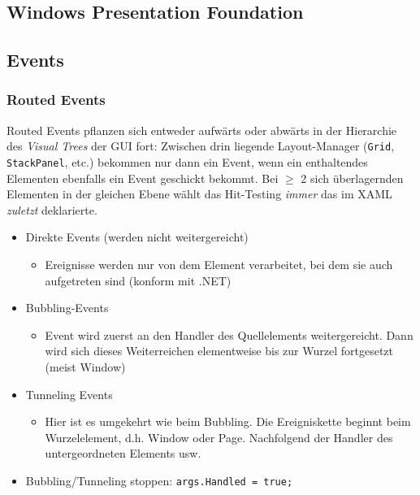 \documentclass
[
	8pt,		%
	ngerman,	%
	a4paper,	%
	landscape,	%
	final		%
]{extarticle}
\begin{document}
\begin{multicols*}{3}
	\section{Windows Presentation Foundation}
	
	
	\subsection{Events}
	
	
	\subsubsection{Routed Events}
	Routed Events pflanzen sich entweder aufwärts oder abwärts in der Hierarchie
	des \emph{Visual Trees} der GUI fort: Zwischen drin liegende Layout-Manager
	(\texttt{Grid}, \texttt{StackPanel}, etc.) bekommen nur dann ein Event, wenn
	ein enthaltendes Elementen ebenfalls ein Event geschickt bekommt. Bei \(\ge\)
	2 sich überlagernden Elementen in der gleichen Ebene wählt das Hit-Testing
	\emph{immer} das im XAML \emph{zuletzt} deklarierte.
	\begin{itemize}
		\item Direkte Events (werden nicht weitergereicht)
		      \begin{itemize}[nolistsep]
			      \item Ereignisse werden nur von dem Element verarbeitet, bei
			            dem sie auch aufgetreten sind (konform mit .NET)
		      \end{itemize}
		\item Bubbling-Events
		      \begin{itemize}[nolistsep]
			      \item Event wird zuerst an den Handler des Quellelements
			            weitergereicht. Dann wird sich dieses Weiterreichen
			            elementweise bis zur Wurzel fortgesetzt (meist Window)
		      \end{itemize}
		\item Tunneling Events
		      \begin{itemize}[nolistsep]
			      \item Hier ist es umgekehrt wie beim Bubbling. Die
			            Ereigniskette beginnt beim Wurzelelement, d.h. Window
			            oder Page. Nachfolgend der Handler des
			            untergeordneten Elements usw.
		      \end{itemize}
		\item Bubbling/Tunneling stoppen: \texttt{args.Handled = true;}
	\end{itemize}

\end{multicols*}
\end{document}
